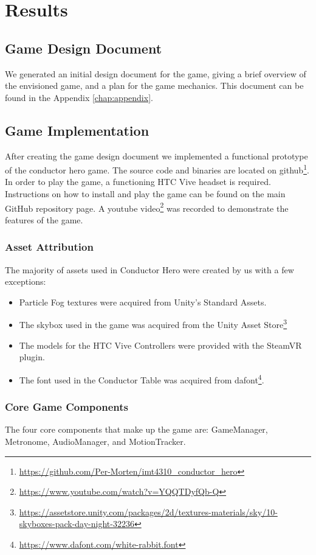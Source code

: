 \chapter{Results} \label{chap:results}

\section{Game Design Document}
We generated an initial design document for the game, giving a brief overview of the envisioned game, and a plan for the game mechanics. This document can be found in the Appendix \ref{chap:appendix}.

\section{Game Implementation}
After creating the game design document we implemented a functional prototype of the conductor hero game. The source code and binaries are located on github\footnote{\url{https://github.com/Per-Morten/imt4310_conductor_hero}}. In order to play the game, a functioning HTC Vive headset is required. Instructions on how to install and play the game can be found on the main GitHub repository page. A youtube video\footnote{\url{https://www.youtube.com/watch?v=YQQTDyfQb-Q}} was recorded to demonstrate the features of the game.

\subsection{Asset Attribution}
The majority of assets used in Conductor Hero were created by us with a few exceptions:
\begin{itemize}
\item Particle Fog textures were acquired from Unity’s Standard Assets.
\item The skybox used in the game was acquired from the Unity Asset Store\footnote{\url{ https://assetstore.unity.com/packages/2d/textures-materials/sky/10-skyboxes-pack-day-night-32236}}   
\item The models for the HTC Vive Controllers were provided with the SteamVR plugin. 
\item The font used in the Conductor Table was acquired from dafont\footnote{\url{ https://www.dafont.com/white-rabbit.font}}. 
\end{itemize}

\subsection{Core Game Components}
The four core components that make up the game are: GameManager, Metronome, AudioManager, and MotionTracker.

